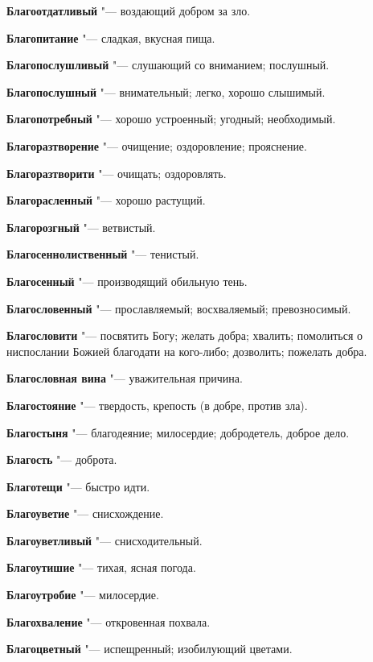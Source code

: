\begin{mymulticols}
\noindent\textbf{Благоотдатливый} "--- воздающий добром за зло. 

\noindent\textbf{Благопитание} "--- сладкая, вкусная пища. 

\noindent\textbf{Благопослушливый} "--- слушающий со вниманием; послушный. 

\noindent\textbf{Благопослушный} "--- внимательный; легко, хорошо слышимый. 

\noindent\textbf{Благопотребный} "--- хорошо устроенный; угодный; необходимый. 

\noindent\textbf{Благоразтворение} "--- очищение; оздоровление; прояснение. 

\noindent\textbf{Благоразтворити} "--- очищать; оздоровлять. 

\noindent\textbf{Благорасленный} "--- хорошо растущий. 

\noindent\textbf{Благорозгный} "--- ветвистый. 

\noindent\textbf{Благосеннолиственный} "--- тенистый. 

\noindent\textbf{Благосенный} "--- производящий обильную тень. 

\noindent\textbf{Благословенный} "--- прославляемый; восхваляемый; превозносимый. 

\noindent\textbf{Благословити} "--- посвятить Богу; желать добра; хвалить; помолиться о ниспослании Божией благодати на кого-либо; дозволить; пожелать добра. 

\noindent\textbf{Благословная вина} "--- уважительная причина. 

\noindent\textbf{Благостояние} "--- твердость, крепость (в добре, против зла). 

\noindent\textbf{Благостыня} "--- благодеяние; милосердие; добродетель, доброе дело. 

\noindent\textbf{Благость} "--- доброта. 

\noindent\textbf{Благотещи} "--- быстро идти. 

\noindent\textbf{Благоуветие} "--- снисхождение. 

\noindent\textbf{Благоуветливый} "--- снисходительный. 

\noindent\textbf{Благоутишие} "--- тихая, ясная погода. 

\noindent\textbf{Благоутробие} "--- милосердие. 

\noindent\textbf{Благохваление} "--- откровенная похвала. 

\noindent\textbf{Благоцветный} "--- испещренный; изобилующий цветами. 


\end{mymulticols}
